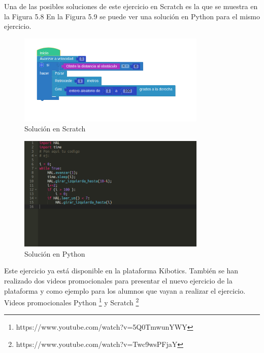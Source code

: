 Una de las posibles soluciones de este ejercicio en Scratch es la que se muestra en la Figura 5.8 En la Figura 5.9 se puede ver una solución en Python  para el mismo ejercicio.

\begin{figure}[H]
    \centering
    \includegraphics[width=0.8\textwidth, height=0.4\textwidth]{chapters/images/solucionroombascratch.png}
    \caption{Solución en Scratch }
    \label{fig:my_label}
\end{figure}
\begin{figure}[H]
    \centering
    \includegraphics[width=0.8\textwidth, height=0.4\textwidth]{chapters/images/solucionroombapython.png}
    \caption{Solución en Python}
    \label{fig:my_label}
\end{figure}


Este ejercicio ya está disponible en la plataforma Kibotics. También se han realizado dos videos promocionales para presentar el nuevo ejercicio de la plataforma y como ejemplo para  los alumnos que vayan a realizar el ejercicio. Videos promocionales Python  \footnote{https://www.youtube.com/watch?v=5Q0TmwunYWY} y Scratch \footnote{https://www.youtube.com/watch?v=Twc9wsPFjaY}
